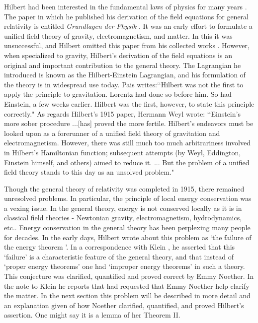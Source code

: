 Hilbert had been interested in the fundamental laws of physics for many years \cite{reid}.
The paper in which he published his derivation of the field equations for general relativity
is entitled {\it{Grundlagen der Physik}} \cite{hilbert}.  It was an early effort to formulate
a unified field theory of gravity, electromagnetism, and matter.  In this it was
unsuccessful, and Hilbert omitted this paper from his collected works \cite{hilbert1}.
However, when specialized to gravity, Hilbert's derivation of the field equations is an
original and important contribution to the general theory.  The Lagrangian he introduced is
known as the Hilbert-Einstein Lagrangian, and his formulation of the theory is in widespread
use today.  Pais writes:\lq\lq Hilbert was not the first to apply the principle to
gravitation.  Lorentz had done so before him.  So had Einstein, a few weeks earlier.  Hilbert
was the first, however, to state this principle correctly."  As regards Hilbert's 1915 paper,
Hermann Weyl \cite{reid} wrote:  \lq\lq Einstein's more sober procedure ...[has] proved the
more fertile.  Hilbert's endeavors must be looked upon as a forerunner of a unified field
theory of gravitation and electromagnetism.  However, there was still much too much
arbitrariness involved in Hilbert's Hamiltonian function; subsequent attempts (by Weyl,
Eddington, Einstein himself, and others) aimed to reduce it.  ...  But the problem of a
unified field theory stands to this day as an unsolved problem."



Though the general theory of relativity was completed in 1915, there remained unresolved
problems.  In particular, the principle of local energy conservation was a vexing issue.  In the general theory, energy
is not conserved locally as it is in classical field theories - Newtonian gravity,
electromagnetism, hydrodynamics, etc..  Energy conservation in the general theory has been
perplexing many people for decades.  In the early days, Hilbert wrote about 
this problem as \lq the
failure of the energy theorem '. In a correspondence with Klein \cite{klein}, 
he asserted that this `failure' is  a characteristic feature of the general
theory, and that instead of `proper energy theorems' one had
`improper energy theorems' in such a theory. This conjecture was clarified,
quantified and proved correct by Emmy Noether.  In the note to Klein 
he reports that had requested that Emmy Noether help 
clarify the matter. In the next section this problem will be
described in
more detail and an explanation given of how Noether clarified, quantified, and
proved Hilbert's assertion. One might say it is a lemma of her Theorem II. 

